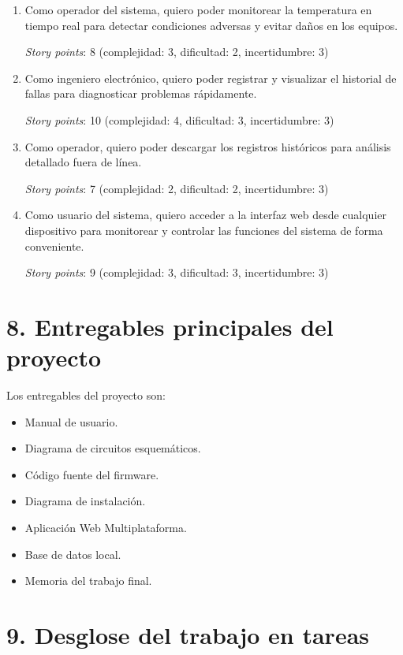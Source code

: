 \documentclass[
11pt, %
]{charter}
\begin{document}
\begin{enumerate}
	\item Como operador del sistema, quiero poder monitorear la temperatura en tiempo real para detectar condiciones adversas y evitar daños en los equipos.
	
	\textit{Story points}: 8 (complejidad: 3, dificultad: 2, incertidumbre: 3)
	
	\item Como ingeniero electrónico, quiero poder registrar y visualizar el historial de fallas para diagnosticar problemas rápidamente.
	
	\textit{Story points}: 10 (complejidad: 4, dificultad: 3, incertidumbre: 3)
	
	\item Como operador, quiero poder descargar los registros históricos para análisis detallado fuera de línea.
	
	\textit{Story points}: 7 (complejidad: 2, dificultad: 2, incertidumbre: 3)
	
	\item Como usuario del sistema, quiero acceder a la interfaz web desde cualquier dispositivo para monitorear y controlar las funciones del sistema de forma conveniente.
	
	\textit{Story points}: 9 (complejidad: 3, dificultad: 3, incertidumbre: 3)
	
\end{enumerate}

\section{8. Entregables principales del proyecto}
\label{sec:entregables}

Los entregables del proyecto son:

\begin{itemize}
	\item Manual de usuario.
	\item Diagrama de circuitos esquemáticos.
	\item Código fuente del firmware.
	\item Diagrama de instalación.
	\item Aplicación Web Multiplataforma.
	\item Base de datos local.
	\item Memoria del trabajo final.
\end{itemize}


\section{9. Desglose del trabajo en tareas}
\label{sec:wbs}
\end{document}
